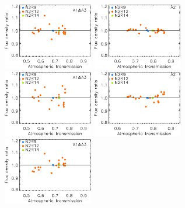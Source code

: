 \begin{figure}[ht!]
\begin{center}
    \includegraphics[clip=true, trim={0, -0.3cm, -0.3cm, 0}, width=0.35\textwidth]{Figures/Calibration/plot_flux_density_ratio_obstau_uranus_corrected_skydip_narrow_1mm.pdf}\hspace{0.2cm}
    \includegraphics[clip=true, trim={0, -0.3cm, -0.3cm, 0}, width=0.35\textwidth]{Figures/Calibration/plot_flux_density_ratio_obstau_uranus_corrected_skydip_narrow_a2.pdf}
    \vspace{0.3cm}
    \includegraphics[clip=true, trim={0, -0.3cm, -0.3cm, 0}, width=0.35\textwidth]{Figures/Calibration/plot_flux_density_ratio_obstau_uranus_tau225_narrow_1mm.pdf}\hspace{0.2cm}
    \includegraphics[clip=true, trim={0, -0.3cm, -0.3cm, 0}, width=0.35\textwidth]{Figures/Calibration/plot_flux_density_ratio_obstau_uranus_tau225_narrow_a2.pdf}
    \vspace{0.3cm}
    \includegraphics[clip=true, trim={0, -0.3cm, -0.3cm, 0}, width=0.35\textwidth]{Figures/Calibration/plot_flux_density_ratio_obstau_uranus_skydip_narrow_1mm.pdf}\hspace{0.2cm}

\end{center}
\end{figure}
